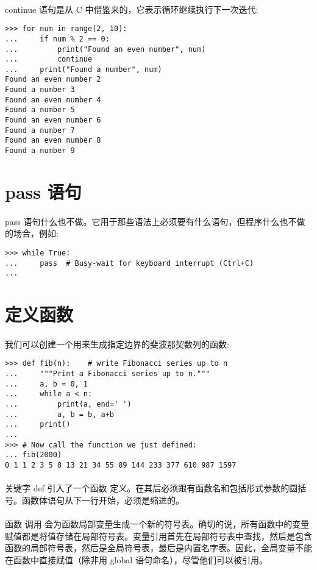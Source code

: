 \documentclass{article}
\begin{document}
\begin{CJK}{UTF8}{gbsn}
\paragraph{}
continue 语句是从 C 中借鉴来的，它表示循环继续执行下一次迭代:
\begin{verbatim}
>>> for num in range(2, 10):
...     if num % 2 == 0:
...         print("Found an even number", num)
...         continue
...     print("Found a number", num)
Found an even number 2
Found a number 3
Found an even number 4
Found a number 5
Found an even number 6
Found a number 7
Found an even number 8
Found a number 9
\end{verbatim}
\section{pass 语句}
\paragraph{}
pass 语句什么也不做。它用于那些语法上必须要有什么语句，但程序什么也不做的场合，例如:
\begin{verbatim}
>>> while True:
...     pass  # Busy-wait for keyboard interrupt (Ctrl+C)
...
\end{verbatim}
\section{定义函数}
\paragraph{}
我们可以创建一个用来生成指定边界的斐波那契数列的函数:
\begin{verbatim}
>>> def fib(n):    # write Fibonacci series up to n
...     """Print a Fibonacci series up to n."""
...     a, b = 0, 1
...     while a < n:
...         print(a, end=' ')
...         a, b = b, a+b
...     print()
...
>>> # Now call the function we just defined:
... fib(2000)
0 1 1 2 3 5 8 13 21 34 55 89 144 233 377 610 987 1597
\end{verbatim}
\paragraph{}
关键字 def 引入了一个函数 定义。在其后必须跟有函数名和包括形式参数的圆括号。函数体语句从下一行开始，必须是缩进的。
\paragraph{}
函数 调用 会为函数局部变量生成一个新的符号表。确切的说，所有函数中的变量赋值都是将值存储在局部符号表。变量引用首先在局部符号表中查找，然后是包含函数的局部符号表，然后是全局符号表，最后是内置名字表。因此，全局变量不能在函数中直接赋值（除非用 global 语句命名），尽管他们可以被引用。

\end{CJK}
\end{document}
